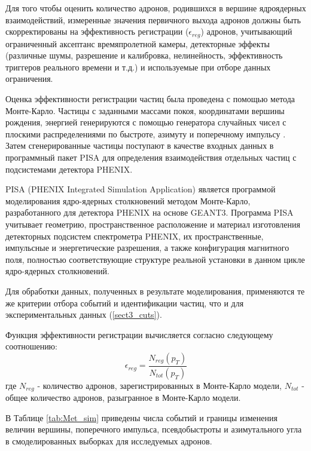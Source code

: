 Для того чтобы оценить количество адронов, родившихся в вершине ядроядерных взаимодействий, измеренные значения первичного выхода адронов должны быть скорректированы на эффективность регистрации ($\epsilon_{reg}$) адронов, учитывающий ограниченный аксептанс времяпролетной камеры, детекторные эффекты (различные шумы, разрешение и калибровка, нелинейность, эффективность триггеров реального времени и т.д.) и используемые при отборе данных ограничения.

Оценка эффективности регистрации частиц была проведена с помощью метода Монте-Карло.
Частицы с заданными массами покоя, координатами вершины рождения, энергией генерируются с помощью генератора  случайных чисел с плоскими распределениями по быстроте, азимуту и поперечному импульсу \pt. Затем сгенерированные частицы поступают в качестве входных данных в программный пакет PISA для определения взаимодействия отдельных частиц с подсистемами детектора PHENIX. 

PISA (PHENIX Integrated Simulation Application) является программой моделирования ядро-ядерных столкновений методом Монте-Карло, разработанного для детектора PHENIX на основе GEANT3.
Программа PISA учитывает геометрию, пространственное расположение и материал изготовления детекторных подсистем спектрометра PHENIX, их пространственные, импульсные и энергетические разрешения, а также конфигурация магнитного поля, полностью соответствующие структуре реальной установки в данном цикле ядро-ядерных столкновений.

Для обработки данных, полученных в результате моделирования, применяются те же критерии отбора событий и идентификации частиц, что и для экспериментальных данных (\ref{sect3_cuts}).

Функция эффективности регистрации вычисляется согласно следующему соотношению:
$$\epsilon_{reg} = \frac{N_{reg}(p_T)}{N_{tot}(p_T)}$$
где $N_{reg}$ - количество адронов, зарегистрированных в Монте-Карло модели, $N_{tot}$ - общее количество адронов, разыгранное в Монте-Карло модели.

В Таблице \ref{tab:Met_sim} приведены числа событий и границы изменения величин вершины, поперечного импульса, псевдобыстроты и азимутального угла в смоделированных выборках для исследуемых адронов.

